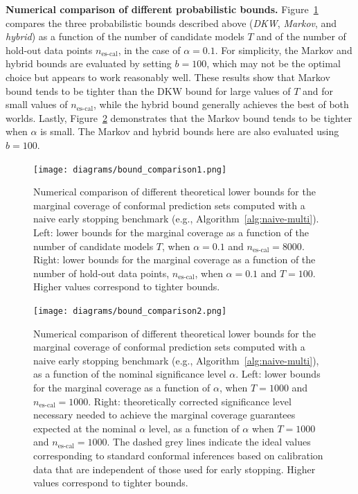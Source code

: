 \noindent \textbf{Numerical comparison of different probabilistic bounds.}
Figure~\ref{fig:bound_tn} compares the three probabilistic bounds described above ({\em DKW}, {\em Markov}, and {\em hybrid}) as a function of the number of candidate models $T$ and of the number of hold-out data points $n_{\text{es-cal}}$, in the case of $\alpha=0.1$. For simplicity, the Markov and hybrid bounds are evaluated by setting $b=100$, which may not be the optimal choice but appears to work reasonably well. These results show that Markov bound tends to be tighter than the DKW bound for large values of $T$ and for small values of $n_{\text{es-cal}}$, while the hybrid bound generally achieves the best of both worlds.
Lastly, Figure~\ref{fig:bound_alpha} demonstrates that the Markov bound tends to be tighter when $\alpha$ is small. The Markov and hybrid bounds here are also evaluated using $b=100$.

\begin{figure}
    \centering
    \texttt{[image: diagrams/bound\_comparison1.png]}
    \caption{Numerical comparison of different theoretical lower bounds for the marginal coverage of conformal prediction sets computed with a naive early stopping benchmark (e.g., Algorithm~\ref{alg:naive-multi}). Left: lower bounds for the marginal coverage as a function of the number of candidate models $T$, when $\alpha=0.1$ and $n_{\text{es-cal}}=8000$.
Right: lower bounds for the marginal coverage as a function of the number of hold-out data points, $n_{\text{es-cal}}$, when $\alpha=0.1$ and $T=100$. Higher values correspond to tighter bounds.
}
    \label{fig:bound_tn}
\end{figure}


\begin{figure}
    \centering
    \texttt{[image: diagrams/bound\_comparison2.png]}
    \caption{Numerical comparison of different theoretical lower bounds for the marginal coverage of conformal prediction sets computed with a naive early stopping benchmark (e.g., Algorithm~\ref{alg:naive-multi}), as a function of the nominal significance level $\alpha$. Left: lower bounds for the marginal coverage as a function of $\alpha$, when $T = 1000$ and $n_{\text{es-cal}}= 1000$.
Right: theoretically corrected significance level necessary needed to achieve the marginal coverage guarantees expected at the nominal $\alpha$ level, as a function of $\alpha$ when $T = 1000$ and $n_{\text{es-cal}}= 1000$. The dashed grey lines indicate the ideal values corresponding to standard conformal inferences based on calibration data that are independent of those used for early stopping. Higher values correspond to tighter bounds.
}
    \label{fig:bound_alpha}
\end{figure}


